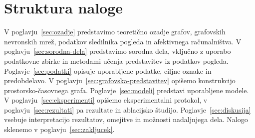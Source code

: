 
\section{Struktura naloge}
\label{subsec:struktura}

V poglavju~\ref{sec:ozadje} predstavimo teoretično ozadje grafov, grafovskih nevronskih mrež, podatkov sledilnika pogleda in afektivnega računalništva.
V poglavju~\ref{sec:sorodna-dela} predstavimo sorodna dela, vključno z uporabo podatkovne zbirke \MAHNOB{} in metodami učenja predstavitev iz podatkov pogleda.
Poglavje~\ref{sec:podatki} opisuje uporabljene podatke, ciljne oznake in predobdelavo.
V poglavju~\ref{sec:grafovska-predstavitev} opišemo konstrukcijo prostorsko-časovnega grafa.
Poglavje~\ref{sec:modeli} predstavi uporabljene modele.
V poglavju~\ref{sec:eksperimenti} opišemo eksperimentalni protokol, v poglavju~\ref{sec:rezultati} pa rezultate in ablacijsko študijo.
Poglavje~\ref{sec:diskusija} vsebuje interpretacijo rezultatov, omejitve in možnosti nadaljnjega dela.
Nalogo sklenemo v poglavju~\ref{sec:zakljucek}.
